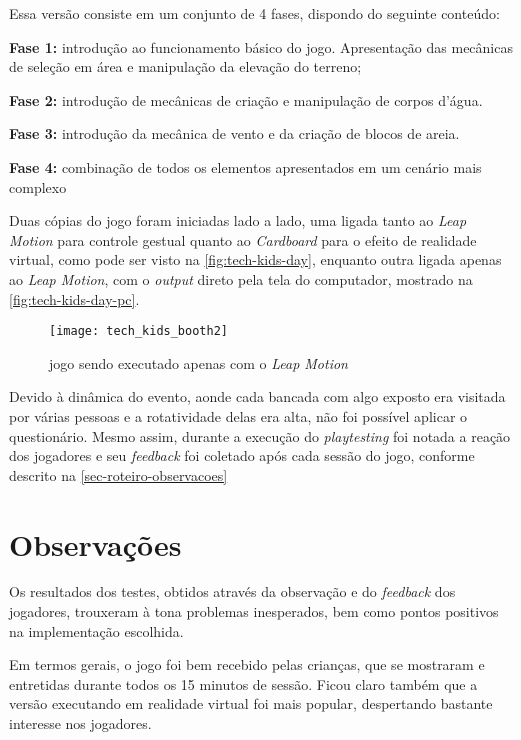 Essa versão consiste em um conjunto de 4 fases, dispondo do seguinte conteúdo:

\begin{alineas}
	\item \textbf{Fase 1:} introdução ao funcionamento básico do jogo. Apresentação das mecânicas de seleção em área e manipulação da elevação do terreno;
	\item \textbf{Fase 2:} introdução de mecânicas de criação e manipulação de corpos d'água.
	\item \textbf{Fase 3:} introdução da mecânica de vento e da criação de blocos de areia.
	\item \textbf{Fase 4:} combinação de todos os elementos apresentados em um cenário mais complexo
\end{alineas}

Duas cópias do jogo foram iniciadas lado a lado, uma ligada tanto 
ao \textit{Leap Motion} para controle gestual quanto ao \textit{Cardboard} 
para o efeito de realidade virtual, como pode ser visto 
na \autoref{fig:tech-kids-day}, enquanto outra ligada apenas ao 
\textit{Leap Motion}, com o \textit{output} direto pela tela do computador, 
mostrado na \autoref{fig:tech-kids-day-pc}.

\begin{figure}[h]
	\centering
	\caption{jogo sendo executado apenas com o \textit{Leap Motion}}
	\texttt{[image: tech\_kids\_booth2]}
	\legend{\fonteAP}
	\label{fig:tech-kids-day-pc}
\end{figure}

Devido à dinâmica do evento, aonde cada bancada com algo exposto era visitada por várias pessoas e a rotatividade delas era alta, não foi possível aplicar o questionário. Mesmo assim, durante a execução do \textit{playtesting} 
foi notada a reação dos 
jogadores e seu \textit{feedback} foi coletado após cada sessão do jogo, 
conforme descrito na \autoref{sec-roteiro-observacoes}

\section{Observações}\label{sec-roteiro-observacoes}

Os resultados dos testes, obtidos através da observação e do 
\textit{feedback} dos jogadores, trouxeram à tona problemas inesperados, 
bem como pontos positivos na implementação escolhida.

Em termos gerais, o jogo foi bem recebido pelas crianças, que se 
mostraram e entretidas durante todos os 15 minutos de sessão. Ficou claro 
também que a versão executando em realidade virtual foi mais popular, 
despertando bastante interesse nos jogadores.


